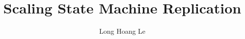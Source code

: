 \documentclass[]{usiinfthesis}
\title{Scaling State Machine Replication} %
\author{Long Hoang Le} %
\begin{document}
\maketitle %

\frontmatter %







\listoffixmes
\tableofcontents
\listoffigures %
\listoftables %

\mainmatter

















\backmatter

% 
% 


\cleardoublepage
\theindex %
\end{document}
